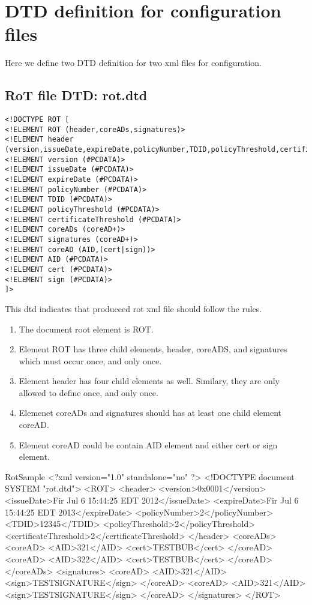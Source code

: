 
\section{DTD definition for configuration files}
Here we define two DTD definition for two xml files for configuration.

\subsection{RoT file DTD: rot.dtd}
\label{sec:rotdtd}

\begin{verbatim}
<!DOCTYPE ROT [
<!ELEMENT ROT (header,coreADs,signatures)>
<!ELEMENT header (version,issueDate,expireDate,policyNumber,TDID,policyThreshold,certificateThreshold)>
<!ELEMENT version (#PCDATA)>
<!ELEMENT issueDate (#PCDATA)>
<!ELEMENT expireDate (#PCDATA)>
<!ELEMENT policyNumber (#PCDATA)>
<!ELEMENT TDID (#PCDATA)>
<!ELEMENT policyThreshold (#PCDATA)>
<!ELEMENT certificateThreshold (#PCDATA)>
<!ELEMENT coreADs (coreAD+)>
<!ELEMENT signatures (coreAD+)>
<!ELEMENT coreAD (AID,(cert|sign))>
<!ELEMENT AID (#PCDATA)>
<!ELEMENT cert (#PCDATA)>
<!ELEMENT sign (#PCDATA)>
]>
\end{verbatim}

This dtd indicates that produceed rot xml file should follow the rules.
\begin{enumerate}
	\item The document root element is ROT.
	\item Element ROT has three child elements, header, coreADS, and signatures which must occur once, and only once.
	\item Element header has four child elements as well. Similary, they are only allowed to define once, and only once.
	\item Elemenet coreADs and signatures should has at least one child element coreAD.
	\item Element coreAD could be contain AID element and either cert or sign element.
\end{enumerate}

\begin{SaveVerbatim}{RotSample}
<?xml version="1.0" standalone="no" ?>
<!DOCTYPE document SYSTEM "rot.dtd">
<ROT>
	<header>
		<version>0x0001</version>
		<issueDate>Fir Jul 6 15:44:25 EDT 2012</issueDate>
		<expireDate>Fir Jul 6 15:44:25 EDT 2013</expireDate>
		<policyNumber>2</policyNumber>
		<TDID>12345</TDID>
		<policyThreshold>2</policyThreshold>
		<certificateThreshold>2</certificateThreshold>
	</header>
	<coreADs>
		<coreAD>
			<AID>321</AID>
			<cert>TESTBUB</cert>
		</coreAD>
		<coreAD>
			<AID>322</AID>
			<cert>TESTBUB</cert>
		</coreAD>
	</coreADs>
	<signatures>
		<coreAD>
			<AID>321</AID>
			<sign>TESTSIGNATURE</sign>
		</coreAD>
		<coreAD>
			<AID>321</AID>
			<sign>TESTSIGNATURE</sign>
		</coreAD>
	</signatures>
</ROT>
\end{SaveVerbatim}

